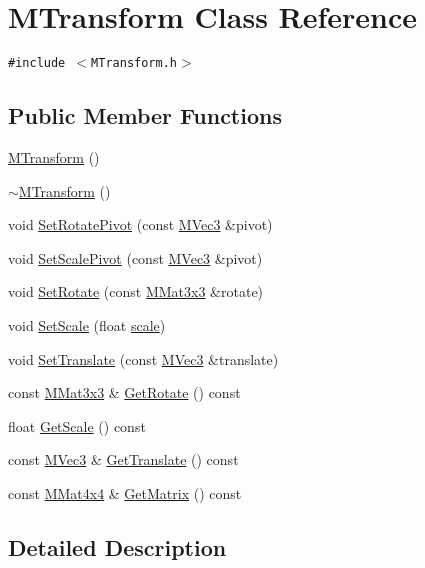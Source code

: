 \hypertarget{class_m_transform}{
\section{MTransform Class Reference}
\label{class_m_transform}
}
{\tt \#include $<$MTransform.h$>$}

\subsection*{Public Member Functions}
\begin{CompactItemize}
\item 
\hyperlink{class_m_transform_bd1c3dd3a80e286f0e6ffd17def8a557}{MTransform} ()
\item 
\hyperlink{class_m_transform_c9aa57f7524bcb418dcad3b4d79c34b8}{$\sim$MTransform} ()
\item 
void \hyperlink{class_m_transform_4f347dd6c167f29787ddc340d4a96473}{SetRotatePivot} (const \hyperlink{class_m_vec3}{MVec3} \&pivot)
\item 
void \hyperlink{class_m_transform_135a0c870171bbab7fe4279da97b7ac5}{SetScalePivot} (const \hyperlink{class_m_vec3}{MVec3} \&pivot)
\item 
void \hyperlink{class_m_transform_a56f36653e8601d3a42a03b661ec161d}{SetRotate} (const \hyperlink{class_m_mat3x3}{MMat3x3} \&rotate)
\item 
void \hyperlink{class_m_transform_cb73de272c406f5aede802ff4eea8e9b}{SetScale} (float \hyperlink{glext__bak_8h_281421b881aa7a1266842b73a3bc7655}{scale})
\item 
void \hyperlink{class_m_transform_f102cc4b732847ed592765b10f779234}{SetTranslate} (const \hyperlink{class_m_vec3}{MVec3} \&translate)
\item 
const \hyperlink{class_m_mat3x3}{MMat3x3} \& \hyperlink{class_m_transform_53ce8dc029fa701a72791d21d8ed33a9}{GetRotate} () const 
\item 
float \hyperlink{class_m_transform_89bb1d5f72e0173f89592f635faf4f3a}{GetScale} () const 
\item 
const \hyperlink{class_m_vec3}{MVec3} \& \hyperlink{class_m_transform_21c3104d078729bfb76802128112c0d5}{GetTranslate} () const 
\item 
const \hyperlink{class_m_mat4x4}{MMat4x4} \& \hyperlink{class_m_transform_15ca5661a8c5eebcc52eaedf0e656363}{GetMatrix} () const 
\end{CompactItemize}


\subsection{Detailed Description}


